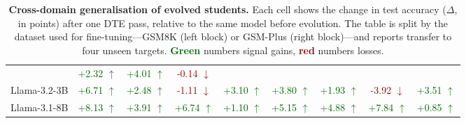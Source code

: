 \documentclass[11pt]{article}
\begin{document}
\begin{table*}[t]
{\begin{tabular}{@{}lcccccccc@{}}
& \textcolor{darkgreen}{+2.32 $\uparrow$}   %
& \textcolor{darkgreen}{+4.01 $\uparrow$}   %
& \textcolor{darkred}{-0.14 $\downarrow$}    %
\\ 
Llama-3.2-3B
& \textcolor{darkgreen}{+6.71 $\uparrow$}   %
& \textcolor{darkgreen}{+2.48 $\uparrow$}   %
& \textcolor{darkred}{-1.11 $\downarrow$}    %
& \textcolor{darkgreen}{+3.10 $\uparrow$}   %
& \textcolor{darkgreen}{+3.80 $\uparrow$}   %
& \textcolor{darkgreen}{+1.93 $\uparrow$}   %
& \textcolor{darkred}{-3.92 $\downarrow$}    %
& \textcolor{darkgreen}{+3.51 $\uparrow$}   %
\\
Llama-3.1-8B
& \textcolor{darkgreen}{+8.13 $\uparrow$}   %
& \textcolor{darkgreen}{+3.91 $\uparrow$}   %
& \textcolor{darkgreen}{+6.74 $\uparrow$}   %
& \textcolor{darkgreen}{+1.10 $\uparrow$}   %
& \textcolor{darkgreen}{+5.15 $\uparrow$}   %
& \textcolor{darkgreen}{+4.88 $\uparrow$}   %
& \textcolor{darkgreen}{+7.84 $\uparrow$}   %
& \textcolor{darkgreen}{+0.85 $\uparrow$}   %
\\
\bottomrule
\end{tabular}
} %
\caption{\textbf{Cross-domain generalisation of evolved students.}  Each cell shows the change in test accuracy (\(\Delta\), in points) after one DTE pass, relative to the same model before evolution. The table is split by the dataset used for fine-tuning—GSM8K (left block) or GSM-Plus (right block)—and reports transfer to four unseen targets. \textcolor{darkgreen}{\textbf{Green}} numbers signal gains, \textcolor{darkred}{\textbf{red}} numbers losses.}
\label{tab:finetune_delta_performance}
\end{table*}
\end{document}
